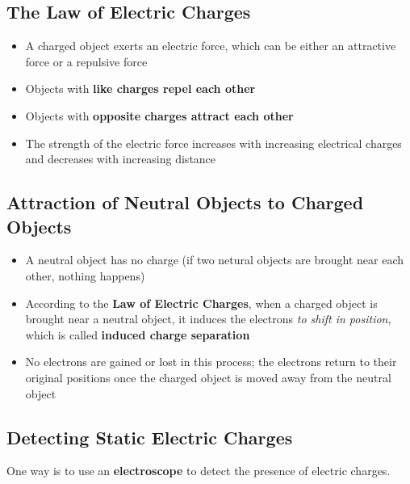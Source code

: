 \documentclass{article}
\begin{document}
    \subsection*{The Law of Electric Charges}

    \begin{itemize}
        \item A charged object exerts an electric force, which can be either an attractive force or a repulsive force
        \item Objects with \textbf{like charges repel each other}
        \item Objects with \textbf{opposite charges attract each other}
        \item The strength of the electric force increases with increasing electrical charges and decreases with increasing distance
    \end{itemize}

    \subsection*{Attraction of Neutral Objects to Charged Objects}
    
    \begin{itemize}
        \item A neutral object has no charge (if two netural objects are brought near each other, nothing happens)
        \item According to the \textbf{Law of Electric Charges}, when a charged object is brought near a neutral object, it induces the electrons \textit{to shift in position}, which is called \textbf{induced charge separation}
        \item No electrons are gained or lost in this process; the electrons return to their original positions once the charged object is moved away from the neutral object
    \end{itemize} 

    \subsection*{Detecting Static Electric Charges}

    One way is to use an \textbf{electroscope} to detect the presence of electric charges.
\end{document}
